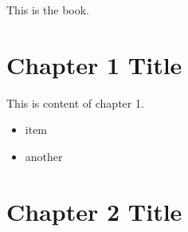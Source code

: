 \documentclass[a4paper]{article}
\begin{document}
This is the book.


\section{Chapter 1 Title%
  \label{chapter-1-title}%
}

This is content of chapter 1.
%
\begin{itemize}

\item item

\item another

\end{itemize}


\section{Chapter 2 Title%
  \label{chapter-2-title}%
}
\end{document}

